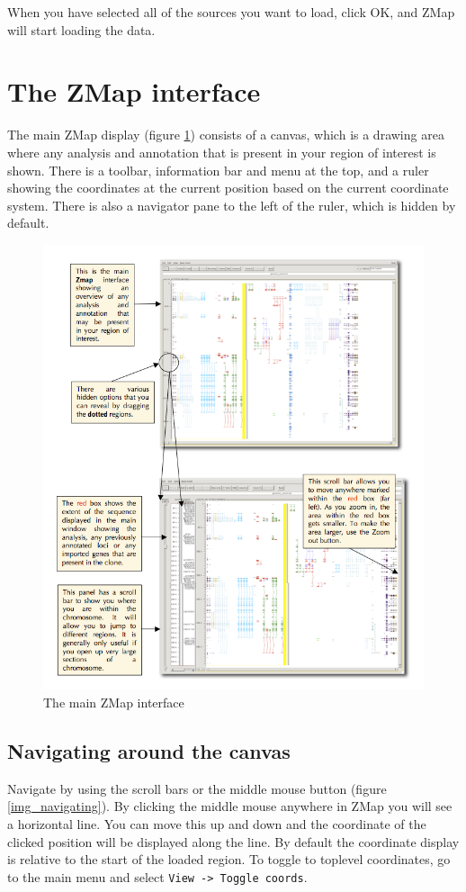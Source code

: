 \documentclass[letterpaper]{article}
\begin{document}
When you have selected all of the sources you want to load, click OK, and ZMap will start loading the data.


\clearpage
\section{The ZMap interface}

The main ZMap display (figure \ref{img_main_interface}) consists of a canvas, which is a drawing area where any analysis and annotation that is present in your region of interest is shown. There is a toolbar, information bar and menu at the top, and a ruler showing the coordinates at the current position based on the current coordinate system. There is also a navigator pane to the left of the ruler, which is hidden by default.

\begin{figure}
\centering
\color[rgb]{0.30980393,0.5058824,0.7411765}
\includegraphics[width=15.231cm]{images/main_interface.png}
\caption{The main ZMap interface}
\label{img_main_interface}
\end{figure}


\subsection{Navigating around the canvas}
Navigate by using the scroll bars or the middle mouse button (figure \ref{img_navigating}). By clicking the middle mouse anywhere in ZMap you will see a horizontal line. You can move this up and down and the coordinate of the clicked position will be displayed along the line. By default the coordinate display is relative to the start of the loaded region. To toggle to toplevel coordinates, go to the main menu and select \lstinline{View -> Toggle coords}.
\end{document}
